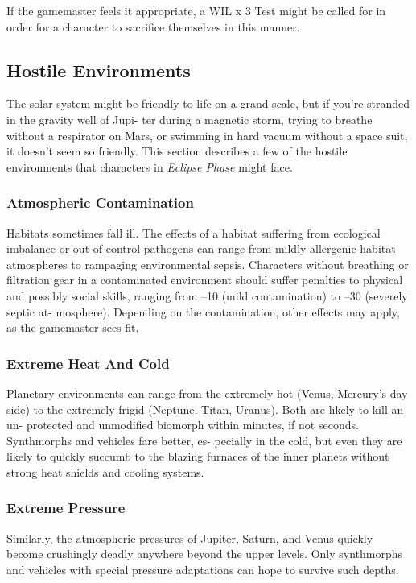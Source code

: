If the gamemaster feels it appropriate, a WIL x 3 
Test might be called for in order for a character to 
sacrifice themselves in this manner.

\subsection{Hostile Environments}


The solar system might be friendly to life on a grand 
scale, but if you're stranded in the gravity well of Jupi-
ter during a magnetic storm, trying to breathe without 
a respirator on Mars, or swimming in hard vacuum 
without a space suit, it doesn't seem so friendly. This 
section describes a few of the hostile environments 
that characters in \textit{Eclipse Phase} might face.

\subsubsection{Atmospheric Contamination}

Habitats sometimes fall ill. The effects of a habitat 
suffering from ecological imbalance or out-of-control 
pathogens can range from mildly allergenic habitat 
atmospheres to rampaging environmental sepsis. 
Characters without breathing or filtration gear in a 
contaminated environment should suffer penalties 
to physical and possibly social skills, ranging from 
–10 (mild contamination) to –30 (severely septic at-
mosphere). Depending on the contamination, other 
effects may apply, as the gamemaster sees fit.

\subsubsection{Extreme Heat And Cold}

Planetary environments can range from the extremely 
hot (Venus, Mercury's day side) to the extremely frigid 
(Neptune, Titan, Uranus). Both are likely to kill an un-
protected and unmodified biomorph within minutes, if 
not seconds. Synthmorphs and vehicles fare better, es-
pecially in the cold, but even they are likely to quickly 
succumb to the blazing furnaces of the inner planets 
without strong heat shields and cooling systems.

\subsubsection{Extreme Pressure}


Similarly, the atmospheric pressures of Jupiter, 
Saturn, and Venus quickly become crushingly deadly 
anywhere beyond the upper levels. Only synthmorphs 
and vehicles with special pressure adaptations can 
hope to survive such depths.

